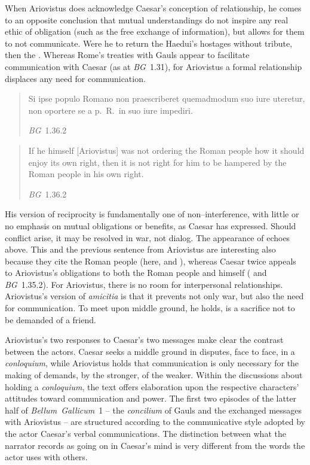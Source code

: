 \documentclass[12pt,letterpaper,oneside,final]{memoir}
\begin{document}
When Ariovistus does acknowledge Caesar's conception of relationship, he comes to an opposite conclusion that mutual understandings do not inspire any real ethic of obligation (such as the free exchange of information), but allows for them to not communicate. Were he to return the Haedui's hostages without tribute, then the . Whereas Rome's treaties with Gauls appear to facilitate communication with Caesar (as at \emph{BG}~1.31), for Ariovistus a formal relationship displaces any need for communication. \blockquote[\emph{BG}~1.36.2]{\textlatin{Si ipse populo Romano non praescriberet quemadmodum suo iure uteretur, non oportere se a p.~R.~in suo iure impediri.}} \blockquote[\emph{BG}~1.36.2]{If he himself [Ariovistus] was not ordering the Roman people how it should enjoy its own right, then it is not right for him to be hampered by the Roman people in his own right.} His version of reciprocity is fundamentally one of non--interference, with little or no emphasis on mutual obligations or benefits, as Caesar has expressed. Should conflict arise, it may be resolved in war, not dialog. The appearance of  echoes  above. This and the previous sentence from Ariovistus are interesting also because they cite the Roman people (here,  and ), whereas Caesar twice appeals to Ariovistus's obligations to both the Roman people and himself ( and  \emph{BG}~1.35.2). For Ariovistus, there is no room for interpersonal relationships. Ariovistus's version of \emph{amicitia} is that it prevents not only war, but also the need for communication. To meet upon middle ground, he holds, is a sacrifice not to be demanded of a friend.

Ariovistus's two responses to Caesar's two messages make clear the contrast between the actors. Caesar seeks a middle ground in disputes, face to face, in a \emph{conloquium}, while Ariovistus holds that communication is only necessary for the making of demands, by the stronger, of the weaker. Within the discussions about holding a \emph{conloquium}, the text offers elaboration upon the respective characters' attitudes toward communication and power. The first two episodes of the latter half of \emph{Bellum~Gallicum}~1 -- the \emph{concilium} of Gauls and the exchanged messages with Ariovistus -- are structured according to the communicative style adopted by the actor Caesar's verbal communications. The distinction between what the narrator records as going on in Caesar's mind is very different from the words the actor uses with others.
\end{document}
